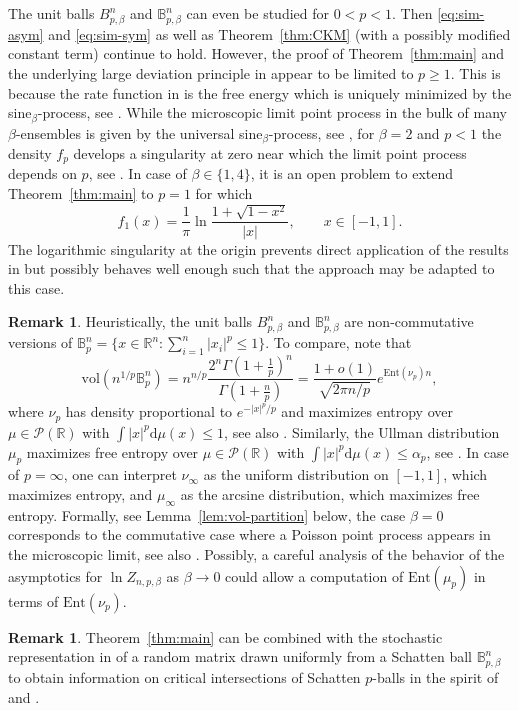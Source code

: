 \documentclass[a4paper,12pt,reqno]{amsart}
\theoremstyle{definition}
\newtheorem{remark}[theorem]{Remark}
\newcommand{\IB}{\mathbb{B}}
\newcommand{\IR}{\mathbb{R}}
\newcommand{\cP}{\mathcal{P}}
\newcommand{\Ent}{\mathrm{Ent}}
\newcommand{\vol}{\mathrm{vol}}
\newcommand{\dd}{\mathrm{d}}
\newcommand{\bpb}{\mathbb{B}_{p,\beta}^n}
\begin{document}
The unit balls $B_{p,\beta}^n$ and $\bpb$ can even be studied for $0<p<1$. Then \eqref{eq:sim-asym} and \eqref{eq:sim-sym} as well as Theorem~\ref{thm:CKM} (with a possibly modified constant term) continue to hold. However, the proof of Theorem~\ref{thm:main} and the underlying large deviation principle in \cite{LS17} appear to be limited to $p\ge 1$. This is because the rate function in \cite{LS17} is the free energy which is uniquely minimized by the sine$_{\beta}$-process, see \cite{EHL21,HM25}. While the microscopic limit point process in the bulk of many $\beta$-ensembles is given by the universal sine$_{\beta}$-process, see \cite{BEY14,Meh91,VV09}, for $\beta=2$ and $p<1$ the density $f_p$ develops a singularity at zero near which the limit point process depends on $p$, see \cite{CKM23}. In case of $\beta\in \{1,4\}$, it is an open problem to extend Theorem~\ref{thm:main} to $p=1$ for which
\[
f_1(x)
=\frac{1}{\pi}\ln \frac{1+\sqrt{1-x^2}}{|x|},\qquad x\in [-1,1].
\]
The logarithmic singularity at the origin prevents direct application of the results in \cite{LS17} but possibly behaves well enough such that the approach may be adapted to this case. 

\begin{remark}
	Heuristically, the unit balls $B_{p,\beta}^n$ and $\IB_{p,\beta}^n$ are non-commutative versions of $\IB_p^n=\{x\in \IR^n\colon \sum_{i=1}^{n}|x_i|^p\le 1\}$. To compare, note that
\[
\vol(n^{1/p}\IB_{p}^n)
=n^{n/p}\frac{2^n\Gamma(1+\frac{1}{p})^n}{\Gamma(1+\frac{n}{p})}
=\frac{1+o(1)}{\sqrt{2\pi n/p}} e^{\Ent(\nu_p)n},
\]
where $\nu_p$ has density proportional to $e^{-|x|^p/p}$ and maximizes entropy over $\mu\in \cP(\IR)$ with $\int |x|^p\dd\mu(x) \le 1$, see also \cite{KP21}. Similarly, the Ullman distribution $\mu_p$ maximizes free entropy over $\mu\in \cP(\IR)$ with $\int |x|^p\dd\mu(x)\le \alpha_p$, see \cite[Prop.~5.34]{HP00}. In case of $p=\infty$, one can interpret $\nu_{\infty}$ as the uniform distribution on $[-1,1]$, which maximizes entropy, and $\mu_{\infty}$ as the arcsine distribution, which maximizes free entropy. Formally, see Lemma~\ref{lem:vol-partition} below, the case $\beta=0$ corresponds to the commutative case where a Poisson point process appears in the microscopic limit, see also \cite{AD14,BP15,Leb16}. Possibly, a careful analysis of the behavior of the asymptotics for $\ln Z_{n,p,\beta}$ as $\beta\to 0$ could allow a computation of $\Ent(\mu_p)$ in terms of $\Ent(\nu_p)$.
\end{remark}

\begin{remark}
Theorem~\ref{thm:main} can be combined with the stochastic representation in \cite[Cor.~4.3]{KPT20b} of a random matrix drawn uniformly from a Schatten ball $\bpb$ to obtain information on critical intersections of Schatten $p$-balls in the spirit of \cite{KPT20b} and \cite{ST25}. 
\end{remark}
\end{document}
